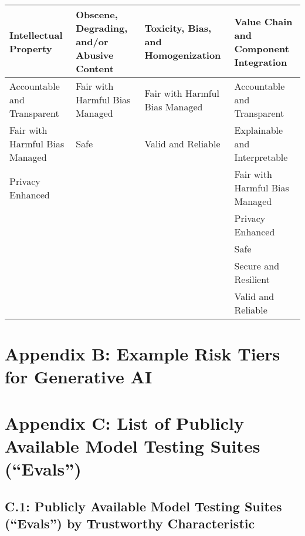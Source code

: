 \documentclass[fleqn]{article}
\begin{document}
\begin{landscape}
\begin{table}[H]
\begin{tabular}{llll}
		\toprule
		Intellectual Property & Obscene, Degrading, and/or Abusive Content & Toxicity, Bias, and Homogenization & Value Chain and Component Integration \\
		\midrule
		Accountable and Transparent & Fair with Harmful Bias Managed & Fair with Harmful Bias Managed & Accountable and Transparent \\
		Fair with Harmful Bias Managed & Safe & Valid and Reliable & Explainable and Interpretable \\
		Privacy Enhanced &  &  & Fair with Harmful Bias Managed \\
 		&  &  & Privacy Enhanced \\
 		&  &  & Safe \\
 		&  &  & Secure and Resilient \\
 		&  &  & Valid and Reliable \\
		\bottomrule
	\end{tabular}
\end{table}
\vfill
\raisebox{-10pt}{\makebox[\linewidth]{\thepage}}
\end{landscape}

\section*{Appendix B: Example Risk Tiers for Generative AI}\label{sec:appndxb}

\section*{Appendix C: List of Publicly Available Model Testing Suites (``Evals'')}\label{sec:appndxc}

\subsection*{C.1: Publicly Available Model Testing Suites (``Evals'') by Trustworthy Characteristic}\label{appndxc1}
\end{document}
